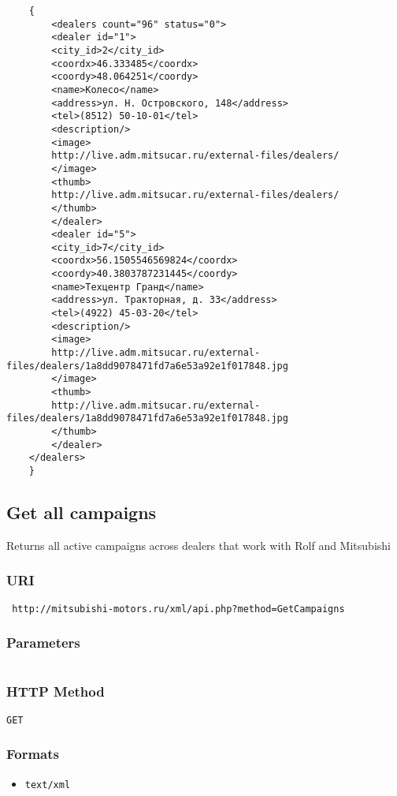 \documentclass[a4paper,9pt]{extarticle}
\begin{document}
		\xmllisting
		\lstset{caption=}
		\begin{lstlisting}
	{
		<dealers count="96" status="0">
		<dealer id="1">
		<city_id>2</city_id>
		<coordx>46.333485</coordx>
		<coordy>48.064251</coordy>
		<name>Колесо</name>
		<address>ул. Н. Островского, 148</address>
		<tel>(8512) 50-10-01</tel>
		<description/>
		<image>
		http://live.adm.mitsucar.ru/external-files/dealers/
		</image>
		<thumb>
		http://live.adm.mitsucar.ru/external-files/dealers/
		</thumb>
		</dealer>
		<dealer id="5">
		<city_id>7</city_id>
		<coordx>56.1505546569824</coordx>
		<coordy>40.3803787231445</coordy>
		<name>Техцентр Гранд</name>
		<address>ул. Тракторная, д. 33</address>
		<tel>(4922) 45-03-20</tel>
		<description/>
		<image>
		http://live.adm.mitsucar.ru/external-files/dealers/1a8dd9078471fd7a6e53a92e1f017848.jpg
		</image>
		<thumb>
		http://live.adm.mitsucar.ru/external-files/dealers/1a8dd9078471fd7a6e53a92e1f017848.jpg
		</thumb>
		</dealer>
	</dealers>
	}
		\end{lstlisting}
	
		\subsection{Get all campaigns}
		Returns all active campaigns across dealers that work with Rolf and Mitsubishi
		\subsubsection*{URI}
					 
			\texttt{
			http://mitsubishi-motors.ru/xml/api.php?method=GetCampaigns}		
		\subsubsection*{Parameters}
		\begin{tabular}{|l|l|}\hline
		\end{tabular}  
		
		\subsubsection*{HTTP Method}
		\texttt{GET}
		\subsubsection*{Formats}
		
	\begin{itemize}
		
		\item \texttt{text/xml}
	
	\end{itemize}
	
\end{document}
